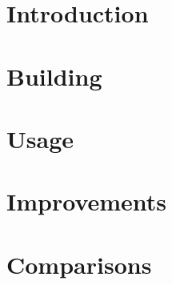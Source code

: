 \documentclass{article}
\begin{document}
\author{}
\maketitle

\section{Introduction}


\section{Building}


\section{Usage}


\section{Improvements}


\section{Comparisons}
\end{document}
